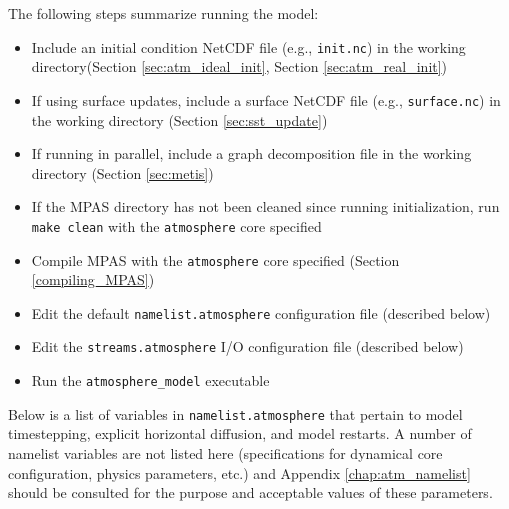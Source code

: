 The following steps summarize running the model:

\begin{itemize}
\item Include an initial condition NetCDF file (e.g., {\tt init.nc}) in the working directory(Section \ref{sec:atm_ideal_init}, Section \ref{sec:atm_real_init})
\item If using surface updates, include a surface NetCDF file (e.g., {\tt surface.nc}) in the working directory (Section \ref{sec:sst_update})
\item If running in parallel, include a graph decomposition file in the working directory (Section \ref{sec:metis})
\item If the MPAS directory has not been cleaned since running initialization, run {\tt make clean} with the {\tt atmosphere} core specified
\item Compile MPAS with the {\tt atmosphere} core specified (Section \ref{compiling_MPAS})
\item Edit the default {\tt namelist.atmosphere} configuration file (described below)
\item Edit the {\tt streams.atmosphere} I/O configuration file (described below)
\item Run the {\tt atmosphere\_model} executable
\end{itemize}

Below is a list of variables in {\tt namelist.atmosphere} that pertain to model timestepping, explicit horizontal diffusion, and model restarts.  A number of namelist variables are not listed here (specifications for dynamical core configuration, physics parameters, etc.) and Appendix \ref{chap:atm_namelist} should be consulted for the purpose and acceptable values of these parameters.

